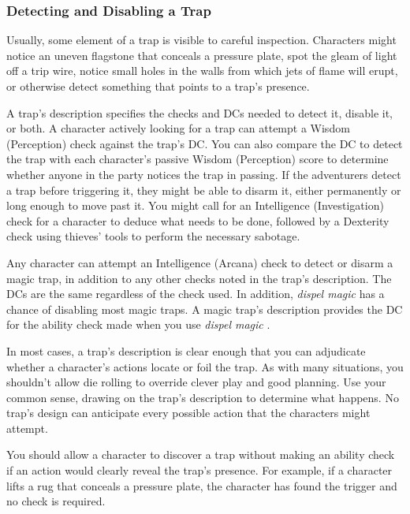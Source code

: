 \documentclass[
]{article}
\begin{document}
\hypertarget{detecting-and-disabling-a-trap}{%
\subsubsection{Detecting and Disabling a
Trap}\label{detecting-and-disabling-a-trap}}

Usually, some element of a trap is visible to careful inspection.
Characters might notice an uneven flagstone that conceals a pressure
plate, spot the gleam of light off a trip wire, notice small holes in
the walls from which jets of flame will erupt, or otherwise detect
something that points to a trap's presence.

A trap's description specifies the checks and DCs needed to detect it,
disable it, or both. A character actively looking for a trap can attempt
a Wisdom (Perception) check against the trap's DC. You can also compare
the DC to detect the trap with each character's passive Wisdom
(Perception) score to determine whether anyone in the party notices the
trap in passing. If the adventurers detect a trap before triggering it,
they might be able to disarm it, either permanently or long enough to
move past it. You might call for an Intelligence (Investigation) check
for a character to deduce what needs to be done, followed by a Dexterity
check using thieves' tools to perform the necessary sabotage.

Any character can attempt an Intelligence (Arcana) check to detect or
disarm a magic trap, in addition to any other checks noted in the trap's
description. The DCs are the same regardless of the check used. In
addition, \emph{dispel magic} has a chance of disabling most magic
traps. A magic trap's description provides the DC for the ability check
made when you use \emph{dispel magic} .

In most cases, a trap's description is clear enough that you can
adjudicate whether a character's actions locate or foil the trap. As
with many situations, you shouldn't allow die rolling to override clever
play and good planning. Use your common sense, drawing on the trap's
description to determine what happens. No trap's design can anticipate
every possible action that the characters might attempt.

You should allow a character to discover a trap without making an
ability check if an action would clearly reveal the trap's presence. For
example, if a character lifts a rug that conceals a pressure plate, the
character has found the trigger and no check is required.
\end{document}
